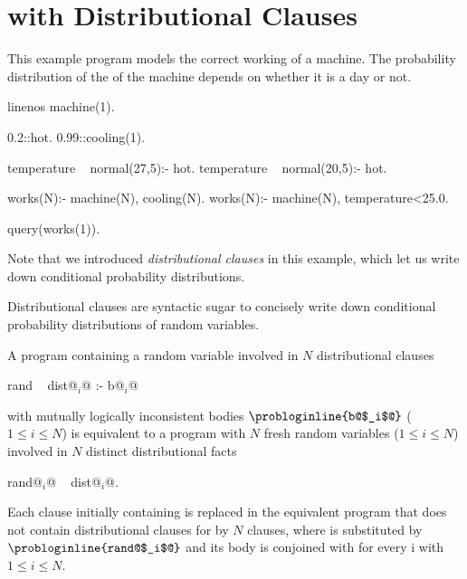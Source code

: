 \section{\dcproblogsty with Distributional Clauses}



\begin{example} \label{ex:dcproblog_distributional_clause}
	This example program models the correct working of a machine. The probability distribution of the  of the machine depends on whether it is a  day or not.
	\begin{problog*}{linenos}
machine(1).

0.2::hot.
0.99::cooling(1).

temperature ~ normal(27,5):- hot.
temperature ~ normal(20,5):- \+hot. 

works(N):- machine(N), cooling(N).
works(N):- machine(N), temperature<25.0. 

query(works(1)).
	\end{problog*}
	Note that we introduced {\em distributional clauses} in this example, which let us write down conditional probability distributions. 
\end{example}






\begin{definition}
	Distributional clauses are syntactic sugar to concisely write down conditional probability distributions of random variables. 

	
\end{definition}




\begin{definition}




	A \dcproblogsty program containing a random variable  involved in $N$ distributional clauses
    \begin{problog}
rand ~ dist@$_i$@ :- b@$_i$@
    \end{problog}
	with mutually logically inconsistent bodies $\text{\probloginline{b@$_i$@}}$ ($1{\leq} i {\leq} N$)
	is equivalent to a \dcproblogsty program with $N$ fresh random variables  ($1{\leq} i {\leq} N$) involved in $N$ distinct distributional facts
    \begin{problog}
rand@$_i$@ ~ dist@$_i$@.
    \end{problog}
    Each clause initially containing  is replaced in the equivalent program that does not contain distributional clauses for  by $N$ clauses, where  is substituted by $\text{\probloginline{rand@$_i$@}}$ and its body is conjoined with  for every i with $1{\leq} i {\leq} N$.

\end{definition}



